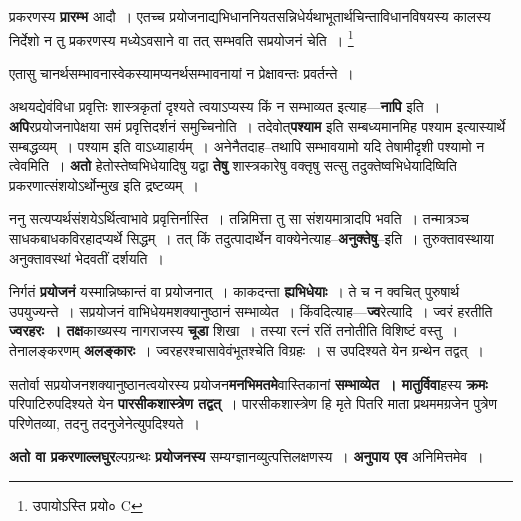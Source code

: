 \documentclass[article,12pt,a4paper]{memoir}
\begin{document}
	  \pstart प्रकरणस्य \textbf{प्रारम्भ} आदौ । एतच्च प्रयोजनाद्यभिधाननियतसन्निधेर्यथाभूतार्थचिन्ताविधानविषयस्य कालस्य निर्देशो न तु प्रकरणस्य \leavevmode{} मध्येऽवसाने वा तत् सम्भवति सप्रयोजनं चेति ।
	\pend
      \footnote{उपायोऽस्ति प्रयो० C}
	  \bigskip
	  \begingroup
	

	  \pstart एतासु चानर्थसम्भावनास्वेकस्यामप्यनर्थसम्भावनायां न प्रेक्षावन्तः प्रवर्तन्ते ।
	\pend
      
	  \endgroup
	

	  \pstart अथयद्येवंविधा प्रवृत्तिः शास्त्रकृतां दृश्यते त्वयाऽप्यस्य किं न सम्भाव्यत इत्याह—\textbf{नापि} इति । \textbf{अपि}रप्रयोजनापेक्षया समं प्रवृत्तिदर्शनं समुच्चिनोति । तदेवोत्\textbf{पश्याम} इति सम्बध्यमानमिह पश्याम इत्यास्यार्थे सम्बद्धव्यम् । पश्याम इति वाऽध्याहार्यम् । अनेनैतदाह--तथापि सम्भावयामो यदि तेषामीदृशी पश्यामो न त्वेवमिति । \textbf{अतो} हेतोस्तेष्वभिधेयादिषु यद्वा \textbf{तेषु} शास्त्रकारेषु वक्तृषु सत्सु तदुक्तेष्वभिधेयादिष्विति प्रकरणात्संशयोऽर्थोन्मुख इति द्रष्टव्यम् ।
	\pend
      

	  \pstart ननु सत्यप्यर्थसंशयेऽर्थित्वाभावे प्रवृत्तिर्नास्ति । तन्निमित्ता तु सा संशयमात्रादपि भवति । तन्मात्रञ्च साधकबाधकविरहादप्यर्थे सिद्धम् । तत् किं तदुत्पादार्थेन वाक्येनेत्याह--\textbf{अनुक्तेषु}--इति । तुरुक्तावस्थाया अनुक्तावस्थां भेदवतीं दर्शयति ।
	\pend
      

	  \pstart निर्गतं \textbf{प्रयोजनं} यस्मान्निष्कान्तं वा प्रयोजनात् । काकदन्ता \textbf{ह्यभिधेयाः} । ते च न क्वचित् पुरुषार्थ उपयुज्यन्ते । सप्रयोजनं वाभिधेयमशक्यानुष्ठानं सम्भाव्येत । किंवदित्याह—\textbf{ज्व}रेत्यादि । ज्वरं हरतीति \textbf{ज्वरहरः । तक्ष}काख्यस्य नागराजस्य \textbf{चूडा} शिखा । तस्या रत्नं रतिं तनोतीति विशिष्टं वस्तु । तेनालङ्करणम् \textbf{अलङ्कारः} । ज्वरहरश्चासावेवंभूतश्चेति विग्रहः । स उपदिश्यते येन ग्रन्थेन तद्वत् ।
	\pend
      

	  \pstart सतोर्वा सप्रयोजनशक्यानुष्ठानत्वयोरस्य प्रयोजन\textbf{मनभिमतमे}वास्तिकानां \textbf{सम्भाव्येत । मातुर्विवा}हस्य \textbf{क्रमः} परिपाटिरुपदिश्यते येन \textbf{पारसीकशास्त्रेण तद्वत्} । पारसीकशास्त्रेण हि मृते पितरि माता प्रथममग्रजेन पुत्रेण परिणेतव्या, तदनु तदनुजेनेत्युपदिश्यते ।
	\pend
      

	  \pstart \textbf{अतो वा प्रकरणाल्लघुर}ल्पग्रन्थः \textbf{प्रयोजनस्य} सम्यग्ज्ञानव्युत्पत्तिलक्षणस्य । \textbf{अनुपाय एव} अनिमित्तमेव ।
	\pend
      
\end{document}

